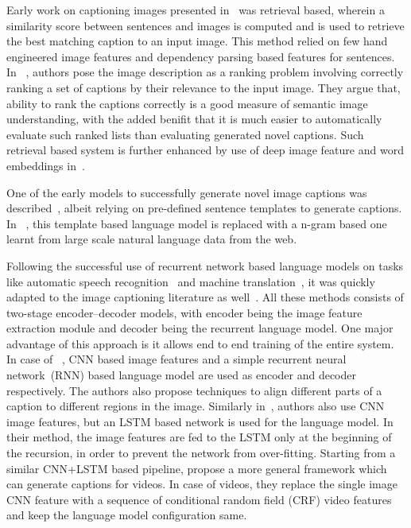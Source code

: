 Early work on captioning images presented in~\cite{Farhadi2010} was retrieval
based, wherein a similarity score between sentences and images is computed and
is used to retrieve the best matching caption to an input image. 
This method relied on few hand engineered image features and dependency parsing
based features for sentences.
In ~\cite{Hodosh2013}, authors pose the image description as a ranking problem
involving correctly ranking a set of captions by their relevance to the input
image.
They argue that, ability to rank the captions correctly is a good measure of
semantic image understanding, with the added benifit that it is much easier to
automatically evaluate such ranked lists than evaluating generated novel
captions.
Such retrieval based system is further enhanced by use of deep image feature and
word embeddings in~\cite{Karpathy2014}.

One of the early models to successfully generate novel image captions was
described~\cite{kulkarni2013babytalk}, albeit relying on pre-defined sentence
templates to generate captions.
In ~\cite{Li2011}, this template based language model is replaced with a n-gram
based one learnt from large scale natural language data from the web.

Following the successful use of recurrent network based language models on
tasks like automatic speech recognition~\cite{mikolov2010recurrent} and machine
translation~\cite{bahdanau2014neural}, it was quickly adapted to the image
captioning literature as well~\cite{Karpathy_2015_CVPR, Vinyals_2015_CVPR,
donahue2015long}.
All these methods consists of two-stage encoder--decoder models, with 
encoder being the image feature extraction module and decoder being the
recurrent language model.
One major advantage of this approach is it allows end to end training of the
entire system.
In case of ~\cite{Karpathy_2015_CVPR}, CNN based image features and a simple
recurrent neural network~(RNN) based language model are used as encoder and
decoder respectively.
The authors also propose techniques to align different parts of a caption to
different regions in the image. 
Similarly in~\cite{Vinyals_2015_CVPR}, authors also use CNN image features, but
an LSTM based network is used for the language model.
In their method, the image features are fed to the LSTM only at the beginning of
the recursion, in order to prevent the network from over-fitting.
Starting from a similar CNN+LSTM based pipeline,\cite{donahue2015long} propose a
more general framework which can generate captions for videos.
In case of videos, they replace the single image CNN feature with a sequence of
conditional random field (CRF) video features and keep the language model
configuration same.

